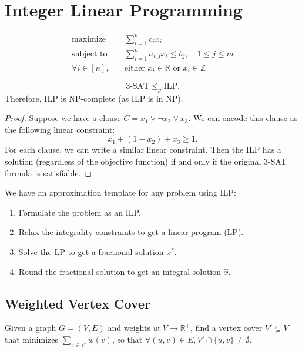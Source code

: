 \chapter{Integer Linear Programming}

\begin{problem}
\begin{align*}
	\text{maximize} \quad    & \sum_{i=1}^n c_i x_i                                            \\
	\text{subject to} \quad  & \sum_{i=1}^n a_{i,j} x_i \leq b_j, \quad 1 \leq j \leq m        \\
	\forall i \in [n], \quad & \text{either } x_i \in \mathbb R \text { or } x_i \in \mathbb Z
\end{align*}
\end{problem}
\begin{theorem}
	\[\text{3-SAT} \leq_p \text{ILP}.\]
	Therefore, ILP is NP-complete (as ILP is in NP).
\end{theorem}
\begin{proof}
	Suppose we have a clause $C = x_1 \vee \neg x_2 \vee x_3$. We can encode this clause as the following linear constraint:
	\[ x_1 + (1 - x_2) + x_3 \geq 1. \]
	For each clause, we can write a similar linear constraint. Then the ILP has a solution (regardless of the objective function) if and only if the original 3-SAT formula is satisfiable.
\end{proof}

\begin{remark}
	We have an approximation template for any problem using ILP:
	\begin{enumerate}
		\item Formulate the problem as an ILP.
		\item Relax the integrality constraints to get a linear program (LP).
		\item Solve the LP to get a fractional solution $x^*$.
		\item Round the fractional solution to get an integral solution $\hat{x}$.
	\end{enumerate}
\end{remark}

\section{Weighted Vertex Cover}

\begin{problem}
Given a graph $G = (V, E)$ and weights $w: V \to \mathbb R^+$, find a vertex cover $V' \subseteq V$ that minimizes $\sum_{v \in V'} w(v)$, so that $\forall (u, v) \in E, V'\cap \{u, v\} \neq \emptyset$.
\end{problem}

